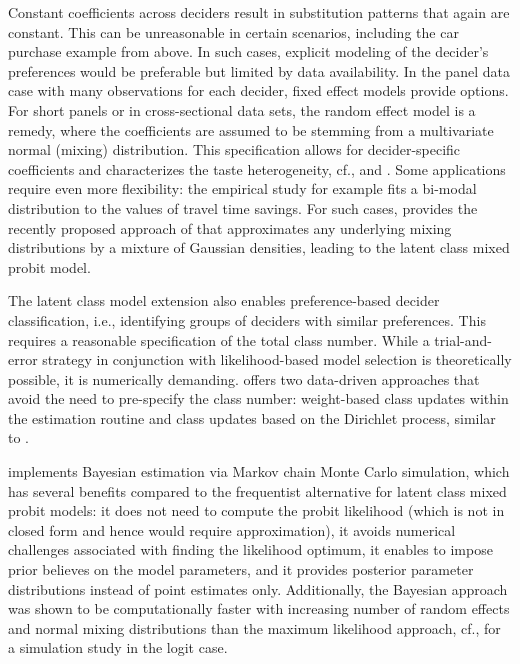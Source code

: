 \documentclass[article,shortnames]{jss}
\begin{document}
Constant coefficients across deciders result in substitution patterns that again are constant. This can be unreasonable in certain scenarios, including the car purchase example from above. In such cases, explicit modeling of the decider's preferences would be preferable but limited by data availability. In the panel data case with many observations for each decider, fixed effect models provide options. For short panels or in cross-sectional data sets, the random effect model is a remedy, where the coefficients are assumed to be stemming from a multivariate normal (mixing) distribution. This specification allows for decider-specific coefficients and characterizes the taste heterogeneity, cf., \cite{Train:2009} and \cite{Bhat:2011}. Some applications require even more flexibility: the empirical study \cite{Cirillo:2006} for example fits a bi-modal distribution to the values of travel time savings. For such cases,  provides the recently proposed approach of \cite{Oelschlaeger:2020} that approximates any underlying mixing distributions by a mixture of Gaussian densities, leading to the latent class mixed probit model.

The latent class model extension also enables preference-based decider classification, i.e., identifying groups of deciders with similar preferences. This requires a reasonable specification of the total class number. While a trial-and-error strategy in conjunction with likelihood-based model selection is theoretically possible, it is numerically demanding.  offers two data-driven approaches that avoid the need to pre-specify the class number: weight-based class updates within the estimation routine \citep{Oelschlaeger:2020} and class updates based on the Dirichlet process, similar to \cite{Burda:2008}.

 implements Bayesian estimation via Markov chain Monte Carlo simulation, which has several benefits compared to the frequentist alternative for latent class mixed probit models: it does not need to compute the probit likelihood (which is not in closed form and hence would require approximation), it avoids numerical challenges associated with finding the likelihood optimum, it enables to impose prior believes on the model parameters, and it provides posterior parameter distributions instead of point estimates only. Additionally, the Bayesian approach was shown to be computationally faster with increasing number of random effects and normal mixing distributions than the maximum likelihood approach, cf., \cite{Train:2001} for a simulation study in the logit case.
\end{document}
